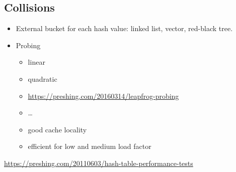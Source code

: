 \subsection{Collisions}

\begin{itemize}
    \item
        External bucket for each hash value: linked list, vector, red-black
        tree.
    \item Probing
        \begin{itemize}
            \item linear
            \item quadratic
            \item \url{https://preshing.com/20160314/leapfrog-probing}
            \item \ldots
            \item good cache locality
            \item efficient for low and medium load factor
        \end{itemize}
\end{itemize}

\url{https://preshing.com/20110603/hash-table-performance-tests}

